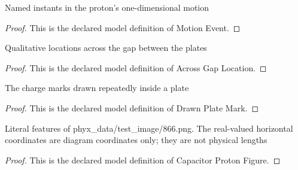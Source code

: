 \begin{definition}
  \label{def:physics:phyx-mini-0866:phyxminiproblems-problemphyxmini0866-motionevent}
  Named instants in the proton's one-dimensional motion
\end{definition}
\begin{proof}
  This is the declared model definition of Motion Event.
\end{proof}
\begin{definition}
  \label{def:physics:phyx-mini-0866:phyxminiproblems-problemphyxmini0866-acrossgaplocation}
  Qualitative locations across the gap between the plates
\end{definition}
\begin{proof}
  This is the declared model definition of Across Gap Location.
\end{proof}
\begin{definition}
  \label{def:physics:phyx-mini-0866:phyxminiproblems-problemphyxmini0866-drawnplatemark}
  The charge marks drawn repeatedly inside a plate
\end{definition}
\begin{proof}
  This is the declared model definition of Drawn Plate Mark.
\end{proof}
\begin{definition}
  \label{def:physics:phyx-mini-0866:phyxminiproblems-problemphyxmini0866-capacitorprotonfigure}
  Literal features of phyx\_data/test\_image/866.png. The real-valued horizontal coordinates are diagram coordinates only; they are not physical lengths
\end{definition}
\begin{proof}
  This is the declared model definition of Capacitor Proton Figure.
\end{proof}
